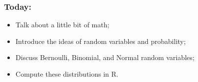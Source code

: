 \documentclass[aspectratio=169]{beamer}
\theoremstyle{principle}
\begin{document}
\begin{frame}
\frametitle{Today:}

\begin{itemize}
\item Talk about a little bit of math;
\bigskip
\bigskip
\bigskip

\item Introduce the ideas of random variables and probability;
\bigskip
\bigskip
\bigskip

\item Discuss Bernoulli, Binomial, and Normal random variables;
\bigskip
\bigskip
\bigskip

\item Compute these distributions in R.

\end{itemize}

\end{frame}
\end{document}
